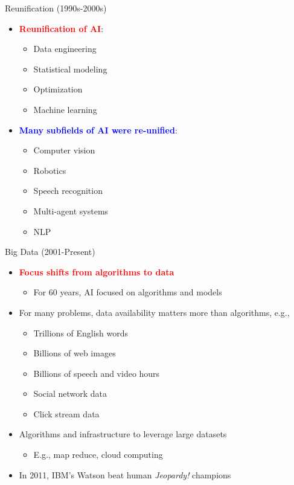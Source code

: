 \documentclass[
  10pt,
  ignorenonframetext,
]{beamer}
\providecommand{\tightlist}{%
  \setlength{\itemsep}{0pt}\setlength{\parskip}{0pt}}
\begin{document}
\begin{frame}{Reunification (1990s-2000s)}
\label{reunification-1990s-2000s}
\begin{itemize}
\tightlist
\item
  \textbf{\textcolor{red}{Reunification of AI}}:

  \begin{itemize}
  \tightlist
  \item
    Data engineering
  \item
    Statistical modeling
  \item
    Optimization
  \item
    Machine learning
  \end{itemize}
\item
  \textbf{\textcolor{blue}{Many subfields of AI were re-unified}}:

  \begin{itemize}
  \tightlist
  \item
    Computer vision
  \item
    Robotics
  \item
    Speech recognition
  \item
    Multi-agent systems
  \item
    NLP
  \end{itemize}
\end{itemize}
\end{frame}

\begin{frame}{Big Data (2001-Present)}
\label{big-data-2001-present}
\begin{itemize}
\tightlist
\item
  \textbf{\textcolor{red}{Focus shifts from algorithms to data}}

  \begin{itemize}
  \tightlist
  \item
    For 60 years, AI focused on algorithms and models
  \end{itemize}
\item
  For many problems, data availability matters more than algorithms,
  e.g.,

  \begin{itemize}
  \tightlist
  \item
    Trillions of English words
  \item
    Billions of web images
  \item
    Billions of speech and video hours
  \item
    Social network data
  \item
    Click stream data
  \end{itemize}
\item
  Algorithms and infrastructure to leverage large datasets

  \begin{itemize}
  \tightlist
  \item
    E.g., map reduce, cloud computing
  \end{itemize}
\item
  In 2011, IBM's Watson beat human \emph{Jeopardy!} champions
\end{itemize}
\end{frame}
\end{document}
